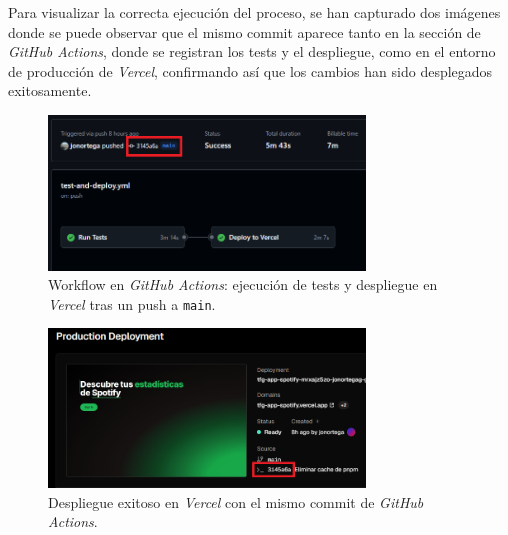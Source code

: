Para visualizar la correcta ejecución del proceso, se han capturado dos imágenes donde se puede observar que el mismo commit aparece tanto en la sección de \textit{GitHub Actions}, donde se registran los tests y el despliegue, como en el entorno de producción de \textit{Vercel}, confirmando así que los cambios han sido desplegados exitosamente.

\begin{figure}[H]
    \centering
    \includegraphics[width=0.75\textwidth]{figures/despliegue/github_actions.png}
    \vspace{0.3cm}
    \caption{Workflow en \textit{GitHub Actions}: ejecución de tests y despliegue en \textit{Vercel} tras un push a \texttt{main}.}
    \label{fig:github_actions}
\end{figure}

\begin{figure}[H]
    \centering
    \includegraphics[width=0.75\textwidth]{figures/despliegue/actions_deploy_vercel.png}
    \vspace{0.3cm}
    \caption{Despliegue exitoso en \textit{Vercel} con el mismo commit de \textit{GitHub Actions}.}
    \label{fig:actions_deploy_vercel}
\end{figure}